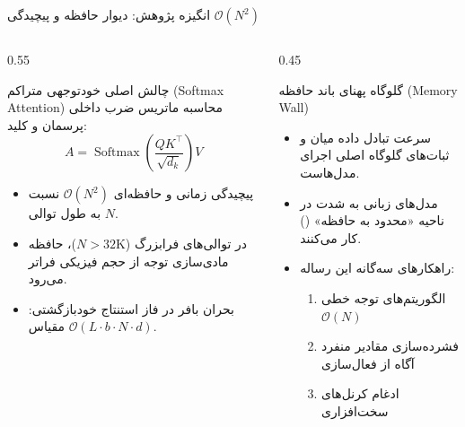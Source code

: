 \documentclass[aspectratio=169,10pt]{beamer}
\begin{document}
\begin{frame}{انگیزه پژوهش: دیوار حافظه و پیچیدگی $\mathcal{O}(N^2)$}
  \begin{columns}
    \begin{column}{0.55\textwidth}
      \begin{block}{چالش اصلی خودتوجهی متراکم (Softmax Attention)}
        محاسبه ماتریس ضرب داخلی پرسمان و کلید:
        \[
          A = \operatorname{Softmax}\left(\frac{Q K^\top}{\sqrt{d_k}}\right) V
        \]
        \begin{itemize}\footnotesize
          \item پیچیدگی زمانی و حافظه‌ای $\mathcal{O}(N^2)$ نسبت به طول توالی $N$.
          \item در توالی‌های فرابزرگ ($N > 32\text{K}$)، حافظه مادی‌سازی توجه از حجم فیزیکی  فراتر می‌رود.
          \item بحران بافر  در فاز استنتاج خودبازگشتی: مقیاس $\mathcal{O}(L \cdot b \cdot N \cdot d)$.
        \end{itemize}
      \end{block}
    \end{column}
    \begin{column}{0.45\textwidth}
      \begin{alertblock}{گلوگاه پهنای باند حافظه (Memory Wall)}
        \begin{itemize}\footnotesize
          \item سرعت تبادل داده میان  و ثبات‌های  گلوگاه اصلی اجرای مدل‌هاست.
          \item مدل‌های زبانی به شدت در ناحیه «محدود به حافظه» () کار می‌کنند.
          \item راهکارهای سه‌گانه این رساله:
            \begin{enumerate}\scriptsize
              \item الگوریتم‌های توجه خطی $\mathcal{O}(N)$
              \item فشرده‌سازی مقادیر منفرد  آگاه از فعال‌سازی
              \item ادغام کرنل‌های سخت‌افزاری 
            \end{enumerate}
        \end{itemize}
      \end{alertblock}
    \end{column}
  \end{columns}
\end{frame}
\end{document}
